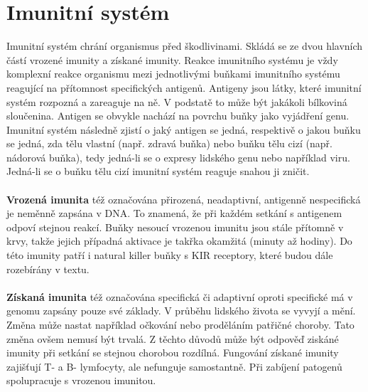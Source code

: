 \documentclass[czech,DP]{thesiskiv}
\numberwithin{equation}{section}
\begin{document}
\section{Imunitní systém}
Imunitní systém chrání organismus před škodlivinami. Skládá se ze dvou hlavních částí vrozené imunity a získané imunity. Reakce imunitního systému je vždy komplexní reakce organismu mezi jednotlivými buňkami imunitního systému reagující na přítomnost specifických antigenů. Antigeny jsou látky, které imunitní systém rozpozná a zareaguje na ně. V podstatě to může být jakákoli bílkoviná sloučenina. Antigen se obvykle nachází na povrchu buňky jako vyjádření genu. Imunitní systém následně zjistí o jaký antigen se jedná, respektivě o jakou buňku se jedná, zda tělu vlastní (např. zdravá buňka) nebo buňku tělu cizí (např. nádorová buňka), tedy jedná-li se o expresy lidského genu nebo například viru. Jedná-li se o buňku tělu cizí imunitní systém reaguje snahou ji zničit. 
\\
\\
\textbf{Vrozená imunita} též označována přirozená, neadaptivní, antigenně nespecifická je neměnně zapsána v DNA. To znamená, že při každém setkání s antigenem odpoví stejnou reakcí. Buňky nesoucí vrozenou imunitu jsou stále přítomně v krvy, takže jejich případná aktivace je takřka okamžitá (minuty až hodiny). Do této imunity patří i natural killer buňky s KIR receptory, které budou dále rozebírány v textu. 
\\
\\
\textbf{Získaná imunita} též označována specifická či adaptivní oproti specifické má v genomu zapsány pouze své základy. V průběhu lidského života se vyvyjí a mění. Změna může nastat například očkování nebo proděláním patřičné choroby. Tato změna ovšem nemusí být trvalá. Z těchto důvodů může být odpověď ziskáné imunity při setkání se stejnou chorobou rozdílná. Fungování získané imunity zajišťují T- a B- lymfocyty, ale nefunguje samostantně. Při zabíjení patogenů spolupracuje s vrozenou imunitou.
\end{document}
